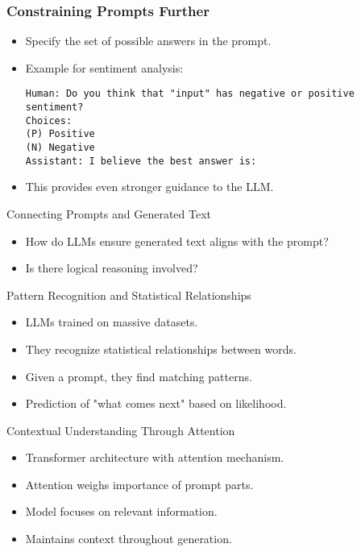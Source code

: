 \documentclass{beamer}
\begin{document}
\begin{frame}[fragile]
    \frametitle{Constraining Prompts Further}
    \begin{itemize}
        \item Specify the set of possible answers in the prompt.
        \item Example for sentiment analysis:
        \begin{verbatim}
Human: Do you think that "input" has negative or positive sentiment?
Choices:
(P) Positive
(N) Negative
Assistant: I believe the best answer is:
        \end{verbatim}
        \item This provides even stronger guidance to the LLM.
    \end{itemize}
\end{frame}


\begin{frame}{Connecting Prompts and Generated Text}
  \begin{itemize}
    \item How do LLMs ensure generated text aligns with the prompt?
    \item Is there logical reasoning involved?
  \end{itemize}
\end{frame}

\begin{frame}{Pattern Recognition and Statistical Relationships}
  \begin{itemize}
    \item LLMs trained on massive datasets.
    \item They recognize statistical relationships between words.
    \item Given a prompt, they find matching patterns.
    \item Prediction of "what comes next" based on likelihood.
  \end{itemize}
\end{frame}

\begin{frame}{Contextual Understanding Through Attention}
  \begin{itemize}
    \item Transformer architecture with attention mechanism.
    \item Attention weighs importance of prompt parts.
    \item Model focuses on relevant information.
    \item Maintains context throughout generation.
  \end{itemize}
\end{frame}
\end{document}
